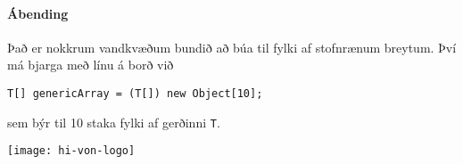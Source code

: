 \documentclass{article}
\begin{document}
\paragraph{Ábending} Það er nokkrum vandkvæðum bundið að búa til fylki af stofnrænum breytum. Því má bjarga með línu á borð við
\begin{center}
\texttt{T[] genericArray = (T[]) new Object[10];}
\end{center}
sem býr til 10 staka fylki af gerðinni \texttt{T}.

\vfill
\texttt{[image: hi-von-logo]}
\end{document}
